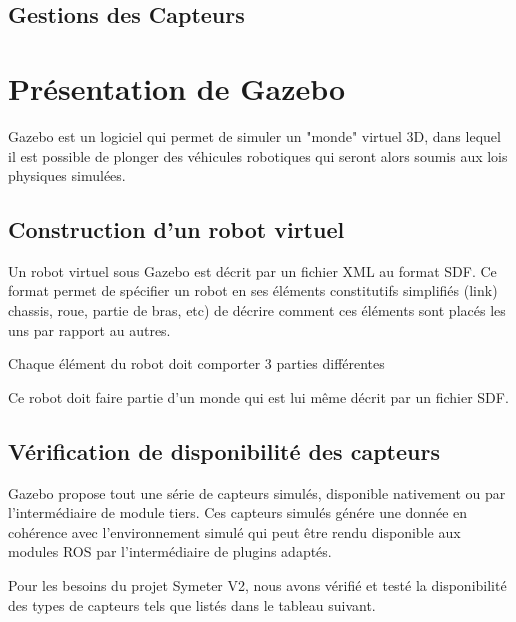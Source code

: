\documentclass[12pt,a4paper]{report}
\begin{document}
		\subsection{Gestions des Capteurs}
		
	\section{Présentation de Gazebo}
	
	Gazebo est un logiciel qui permet de simuler un "monde" virtuel 3D, dans lequel il est possible de plonger des véhicules robotiques qui seront alors soumis aux lois physiques simulées.
	
		\subsection{Construction d'un robot virtuel}
		
		Un robot virtuel sous Gazebo est décrit par un fichier XML au format SDF. Ce format permet de spécifier un robot en ses éléments constitutifs simplifiés (link) chassis, roue, partie de bras, etc) de décrire comment ces éléments sont placés les uns par rapport au autres.
		
		\para Chaque élément  du robot doit comporter 3 parties différentes
		
		\para Ce robot doit faire partie d'un monde qui est lui même décrit par un fichier SDF. 
		

		
		
		\subsection{Vérification de disponibilité des capteurs}
		
		Gazebo propose tout une série de capteurs simulés, disponible nativement ou par l'intermédiaire de module tiers. Ces capteurs simulés génére une donnée en cohérence avec l'environnement simulé qui peut être rendu disponible aux modules ROS par l'intermédiaire de plugins adaptés.
		
		\para Pour les besoins du projet Symeter V2, nous avons vérifié et testé la disponibilité des types de capteurs tels que listés dans le tableau suivant.
		\newline
		
\end{document}
